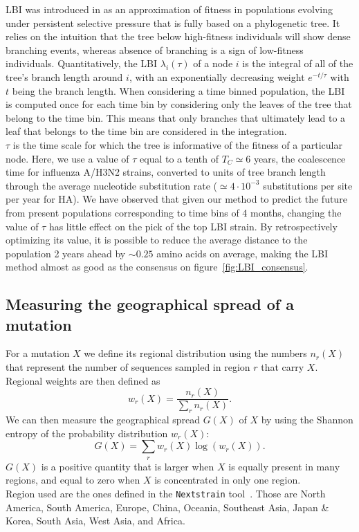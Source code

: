 \documentclass[reprint,amsmath,amssymb,superscriptaddress,showpacs,rmp]{revtex4-1}
\begin{document}
	LBI was introduced in \cite{neher_predicting_2014} as an approximation of fitness in populations evolving under persistent selective pressure that is fully based on a phylogenetic tree. It relies on the intuition that the tree below high-fitness individuals will show dense branching events, whereas absence of branching is a sign of low-fitness individuals. Quantitatively, the LBI $\lambda_i(\tau)$ of a node $i$ is the integral of all of the tree's branch length around $i$, with an exponentially decreasing weight $e^{-t/\tau}$ with $t$ being the branch length. When considering a time binned population, the LBI is computed once for each time bin by considering only the leaves of the tree that belong to the time bin. This means that only branches that ultimately lead to a leaf that belongs to the time bin are considered in the integration.\\
	$\tau$ is the time scale for which the tree is informative of the fitness of a particular node. Here, we use a value of $\tau$ equal to a tenth of $T_C\simeq6$ years, the coalescence time for influenza A/H3N2 strains, converted to units of tree branch length through the average nucleotide substitution rate ($\simeq 4\cdot 10^{-3}$ substitutions per site per year for HA). We have observed that given our method to predict the future from present populations corresponding to time bins of 4 months, changing the value of $\tau$ has little effect on the pick of the top LBI strain. By retrospectively optimizing its value, it is possible to reduce the average distance to the population 2 years ahead by $\sim0.25$ amino acids on average, making the LBI method almost as good as the consensus on figure~\ref{fig:LBI_consensus}.


\subsection*{Measuring the geographical spread of a mutation} %
\label{sub:measuring_the_geographical_spread_of_a_mutation}
	For a mutation $X$ we define its regional distribution using the numbers $n_r(X)$ that represent the number of sequences sampled in region $r$ that carry $X$. Regional weights are then defined as
	$$ w_r(X) = \frac{n_r(X)}{\sum_{r}n_r(X)}.$$
	We can then measure the geographical spread $G(X)$ of $X$ by using the Shannon entropy of the probability distribution $w_r(X)$:
	$$G(X) = \sum_r w_r(X)\log(w_r(X)).$$
	$G(X)$ is a positive quantity that is larger when $X$ is equally present in many regions, and equal to zero when $X$ is concentrated in only one region.\\
	Region used are the ones defined in the \texttt{Nextstrain} tool~\cite{10.1093/bioinformatics/bty407}. Those are {North America}, {South America}, {Europe}, {China}, {Oceania}, {Southeast Asia}, {Japan \& Korea}, {South Asia}, {West Asia}, and {Africa}.
\end{document}
